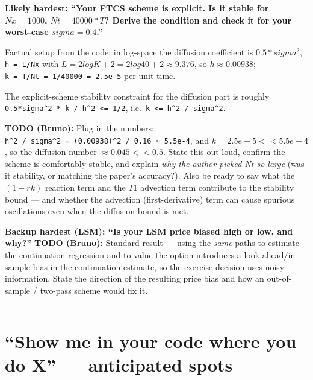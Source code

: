 \documentclass[
  11pt,
]{article}
\begin{document}
\textbf{Likely hardest: ``Your FTCS scheme is explicit. Is it stable for
\(Nx = 1000\), \(Nt = 40000*T\)? Derive the condition and check it for
your worst-case \(sigma = 0.4\).''}

Factual setup from the code: in log-space the diffusion coefficient is
\(0.5*sigma^2\), \texttt{h\ =\ L/Nx} with
\(L = 2 log K + 2 = 2 log 40 + 2 ≈ 9.376\), so \(h ≈ 0.00938\);
\texttt{k\ =\ T/Nt\ =\ 1/40000\ =\ 2.5e-5} per unit time.

The explicit-scheme stability constraint for the diffusion part is
roughly \texttt{0.5*sigma\^{}2\ *\ k\ /\ h\^{}2\ \textless{}=\ 1/2},
i.e.~\texttt{k\ \textless{}=\ h\^{}2\ /\ sigma\^{}2}.

\textbf{TODO (Bruno):} Plug in the numbers:
\texttt{h\^{}2\ /\ sigma\^{}2\ =\ (0.00938)\^{}2\ /\ 0.16\ ≈\ 5.5e-4},
and \(k = 2.5e-5 << 5.5e-4\), so the diffusion number
\(≈ 0.045 << 0.5\). State this out loud, confirm the scheme is
comfortably stable, and explain \emph{why the author picked Nt so large}
(was it stability, or matching the paper's accuracy?). Also be ready to
say what the \((1 - r k)\) reaction term and the \(T1\) advection term
contribute to the stability bound --- and whether the advection
(first-derivative) term can cause spurious oscillations even when the
diffusion bound is met.

\textbf{Backup hardest (LSM): ``Is your LSM price biased high or low,
and why?''} \textbf{TODO (Bruno):} Standard result --- using the
\emph{same} paths to estimate the continuation regression and to value
the option introduces a look-ahead/in-sample bias in the continuation
estimate, so the exercise decision uses noisy information. State the
direction of the resulting price bias and how an out-of-sample /
two-pass scheme would fix it.

\begin{center}\rule{0.5\linewidth}{0.5pt}\end{center}

\hypertarget{show-me-in-your-code-where-you-do-x-anticipated-spots}{%
\section{``Show me in your code where you do X'' --- anticipated
spots}\label{show-me-in-your-code-where-you-do-x-anticipated-spots}}
\end{document}

